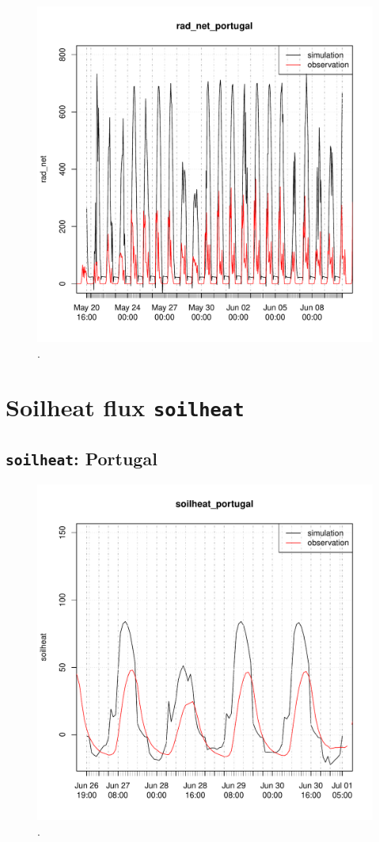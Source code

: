 \documentclass{scrreprt}
\begin{document}
\begin{figure}[ht]
  \centering
  \includegraphics[width=0.8\hsize]{./plot_rad_net_compare_portugal_NSA_2014-04-29_2014-07-01.pdf}
  \caption{.}
  \label{fig:portugal_NSA_radnet1}
\end{figure}

\section{Soilheat flux \texttt{soilheat}}

\subsection{\texttt{soilheat}: Portugal}

\begin{figure}[ht]
  \centering
  \includegraphics[width=0.8\hsize]{./plot_soilheat_compare_portugal_HS_2014-06-26_2014-07-01.pdf}
  \caption{.}
  \label{fig:portugal_HS_soilheat1}
\end{figure}
\end{document}
